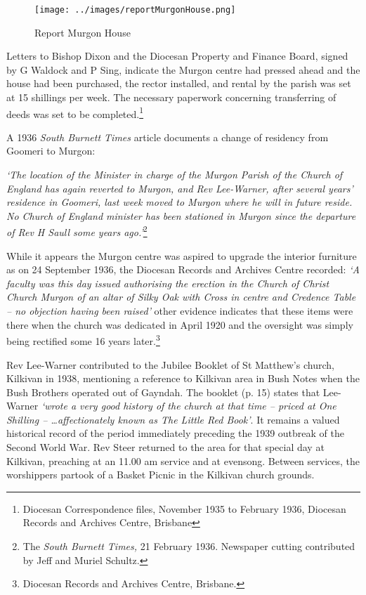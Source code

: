 \begin{figure}[!htb]
\begin{center}
\texttt{[image: ../images/reportMurgonHouse.png]}
\caption{Report Murgon House}
\end{center}
\end{figure}




Letters to Bishop Dixon and the Diocesan Property and Finance Board, signed by G Waldock and P Sing, indicate the Murgon centre had pressed ahead and the house had been purchased, the rector installed, and rental by the parish was set at 15 shillings per week. The necessary paperwork concerning transferring of deeds was set to be completed.\footnote{Diocesan Correspondence files, November 1935 to February 1936, Diocesan Records and Archives Centre, Brisbane}


A 1936 \emph{South Burnett Times} article documents a change of residency from Goomeri to Murgon:



\emph{`The location of the Minister in charge of the Murgon Parish of the Church of England has again reverted to Murgon, and Rev Lee-Warner, after several years' residence in Goomeri, last week moved to Murgon where he will in future reside. No Church of England minister has been stationed in Murgon since the departure of Rev H Saull some years ago.'}\footnote{The \emph{South Burnett Times,} 21 February 1936. Newspaper cutting contributed by Jeff and Muriel Schultz.}


\smallskip


While it appears the Murgon centre was aspired to upgrade the interior furniture as on 24 September 1936, the Diocesan Records and Archives Centre recorded: \emph{`A faculty was this day issued authorising the erection in the Church of Christ Church Murgon of an altar of Silky Oak with Cross in centre and Credence Table -- no objection having been raised'} other evidence indicates that these items were there when the church was dedicated in April 1920 and the oversight was simply being rectified some 16 years later.\footnote{Diocesan Records and Archives Centre, Brisbane.}


Rev Lee-Warner contributed to the Jubilee Booklet of St Matthew's church, Kilkivan in 1938, mentioning a reference to Kilkivan area in Bush Notes when the Bush Brothers operated out of Gayndah. The booklet (p. 15) states that Lee-Warner \emph{`wrote a very good history of the church at that time -- priced at One Shilling -- \ldots affectionately known as The Little Red Book'}. It remains a valued historical record of the period immediately preceding the 1939 outbreak of the Second World War. Rev Steer returned to the area for that special day at Kilkivan, preaching at an 11.00 am service and at evensong. Between services, the worshippers partook of a Basket Picnic in the Kilkivan church grounds.



